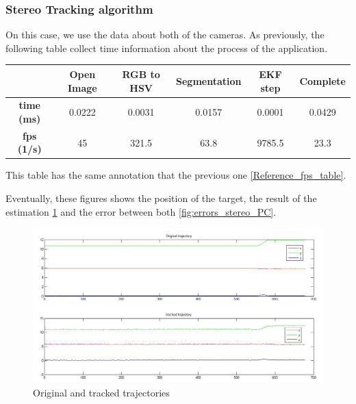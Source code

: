 	\newpage
	
		
	\subsubsection{Stereo Tracking algorithm}
	
	On this case, we use the data about both of the cameras. As previously, the following table collect time information about the process of the application. \\
		
	{                
	\centering
		\begin{tabular}{|c|c|c|c|c||c|}
		\hline  					&  Open Image	&  RGB to HSV 	& Segmentation 	& EKF step  & Complete \\ 
		\hline  \textbf{time (ms)}	&	0.0222		& 	0.0031 		&  	0.0157		&  	0.0001 	&  0.0429		\\ 
		\hline  \textbf{fps (1/s)}	& 	45 			& 	321.5 		& 	63.8 		& 9785.5	&  23.3		\\ 
		\hline 
		\end{tabular} 
	}
	\newline
	
	This table has the same annotation that the previous one \ref{Reference_fps_table}.
	
	Eventually, these figures shows the position of the target, the result of the estimation \ref{fig:trajectories_stereo_PC} and the error between both \ref{fig:errors_stereo_PC}.
	
	\begin{figure}[hp]
		\centering
		\includegraphics[width=\linewidth]{../Images/c4/trajs_stereo}
		\caption{Original and tracked trajectories}
		\label{fig:trajectories_stereo_PC}
	\end{figure}
	
